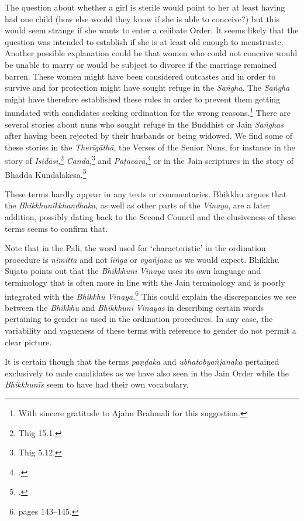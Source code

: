 The question about whether a girl is sterile would point to her at least having had one child (how else would they know if she is able to conceive?) but this would seem strange if she wants to enter a celibate Order. It seems likely that the question was intended to establish if she is at least old enough to menstruate. Another possible explanation could be that women who could not conceive would be unable to marry or would be subject to divorce if the marriage remained barren. These women might have been considered outcastes and in order to survive and for protection might have sought refuge in the {\em Saṅgha}. The {\em Saṅgha} might have therefore established these rules in order to prevent them getting inundated with candidates seeking ordination for the wrong reasons.\footnote{With sincere gratitude to Ajahn Brahmali for this suggestion.} There are several stories about nuns who sought refuge in the Buddhist or Jain {\em Saṅghas} after having been rejected by their husbands or being widowed. We find some of these stories in the {\em Therīgāthā}, the Verses of the Senior Nuns, for instance in the story of {\em Isidāsī},\footnote{Thig 15.1.} {\em Candā},\footnote{Thig 5.12.} and {\em Paṭācārā},\footnote{\cite{hecker}.} or in the Jain scriptures in the story of Bhadda Kundalakesa.\footnote{\cite{hecker}.}

These terms hardly appear in any texts or commentaries. Bhikkhu \cite{sujato2009} argues that the {\em Bhikkhunikkhandhaka}, as well as other parts of the {\em Vinaya}, are a later addition, possibly dating back to the Second Council and the elusiveness of these terms seems to confirm that. 

Note that in the Pali, the word used for `characteristic' in the ordination procedure is {\em nimitta} and not {\em liṅga} or {\em vyañ­jana} as we would expect. Bhikkhu Sujato points out that the {\em Bhikkhunī} {\em Vinaya} uses its own language and terminology that is often more in line with the Jain terminology and is poorly integrated with the {\em Bhikkhu} {\em Vinaya}.\footnote{\cite{sujato2009} pages 143–145.} This could explain the discrepancies we see between the {\em Bhikkhu} and {\em Bhikkhunī} {\em Vinayas} in describing certain words pertaining to gender as used in the ordination procedures. In any case, the variability and vagueness of these terms with reference to gender do not permit a clear picture. 

It is certain though that the terms {\em paṇḍaka} and {\em ubhatob­yañ­janaka} pertained exclusively to male candidates as we have also seen in the Jain Order while the {\em Bhikkhunīs} seem to have had their own vocabulary.

